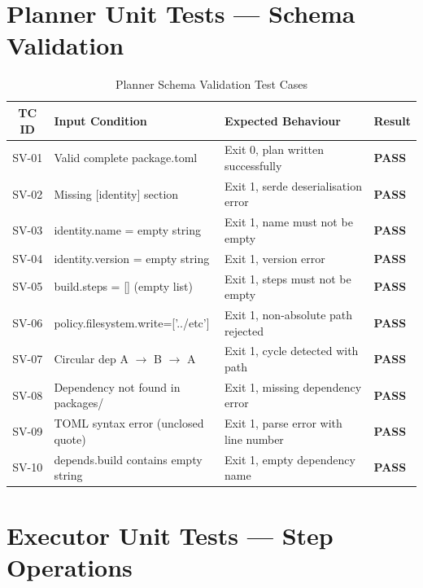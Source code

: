 \documentclass[12pt,a4paper]{report}
\begin{document}
\section{Planner Unit Tests --- Schema Validation}

\begin{table}[H]
\centering
\caption{Planner Schema Validation Test Cases}
\renewcommand{\arraystretch}{1.2}
\begin{tabularx}{\linewidth}{c X X >{\centering\arraybackslash}p{1.5cm}}
\toprule
\textbf{TC ID} & \textbf{Input Condition} & \textbf{Expected Behaviour} & \textbf{Result}\\
\midrule
SV-01 & Valid complete package.toml           & Exit 0, plan written successfully        & \textbf{PASS}\\
SV-02 & Missing [identity] section            & Exit 1, serde deserialisation error      & \textbf{PASS}\\
SV-03 & identity.name = empty string          & Exit 1, name must not be empty           & \textbf{PASS}\\
SV-04 & identity.version = empty string       & Exit 1, version error                    & \textbf{PASS}\\
SV-05 & build.steps = [] (empty list)         & Exit 1, steps must not be empty          & \textbf{PASS}\\
SV-06 & policy.filesystem.write=['../etc']    & Exit 1, non-absolute path rejected       & \textbf{PASS}\\
SV-07 & Circular dep A $\to$ B $\to$ A & Exit 1, cycle detected with path & \textbf{PASS}\\
SV-08 & Dependency not found in packages/     & Exit 1, missing dependency error         & \textbf{PASS}\\
SV-09 & TOML syntax error (unclosed quote)    & Exit 1, parse error with line number     & \textbf{PASS}\\
SV-10 & depends.build contains empty string   & Exit 1, empty dependency name            & \textbf{PASS}\\
\bottomrule
\end{tabularx}
\end{table}

\FloatBarrier
\section{Executor Unit Tests --- Step Operations}
\end{document}
